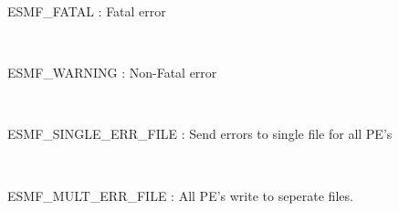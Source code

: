  
\setlength{\parskip}{0pt}
\setlength{\parindent}{0pt}
\setlength{\baselineskip}{11pt}
 
\def\bv{\begin{verbatim}}
\def\ev{\end{verbatim}}
\def\be{\begin{equation}}
\def\ee{\end{equation}}
\def\bea{\begin{eqnarray}}
\def\eea{\end{eqnarray}}
\def\bi{\begin{itemize}}
\def\ei{\end{itemize}}
\def\bn{\begin{enumerate}}
\def\en{\end{enumerate}}
\def\bd{\begin{description}}
\def\ed{\end{description}}
\def\({\left (}
\def\){\right )}
\def\[{\left [}
\def\]{\right ]}
\def\<{\left  \langle}
\def\>{\right \rangle}
\def\cI{{\cal I}}
\def\diag{\mathop{\rm diag}}
\def\tr{\mathop{\rm tr}}


 

  ESMF\_FATAL : Fatal error 
 
\mbox{}\hrulefill\ 
 

  ESMF\_WARNING : Non-Fatal error 
 
\mbox{}\hrulefill\ 
 

  ESMF\_SINGLE\_ERR\_FILE : Send errors to single file for all PE's 
 
\mbox{}\hrulefill\ 
 

  ESMF\_MULT\_ERR\_FILE : All PE's write to seperate files. 
 
